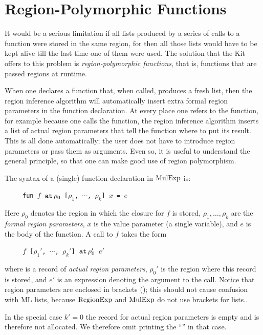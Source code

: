 \documentclass[12pt]{book}
\begin{document}
\section{Region-Polymorphic Functions}
%
It would be a serious limitation if all lists produced by a series of
calls to a function were stored in the same region, for then all those
lists would have to be kept alive till the last time one of them were
used. The solution that the Kit offers to this problem is {\em
  region-polymorphic functions}, that is, functions that are passed
regions at runtime.

When one declares a function that, when called, produces a fresh list,
then the region inference algorithm will automatically insert extra
%
formal region parameters in the function declaration.  At every place
one refers to the function, for example because one calls the
function, the region inference algorithm inserts a list of
%
actual region parameters that tell the function where to put its
result. This is all done automatically; the user does not have to
introduce region parameters or pass them as arguments. Even so, it is
useful to understand the general principle, so that one can make good
use of region polymorphism.

The syntax of a (single) function declaration in $\hbox{\rm MulExp}$ is:
\begin{tabbing}
\ \ \ \ \ \=\tt fun $f$ $\mathbin{\hbox{\tt at}}\,\rho_0$ [$\rho_1$, $\cdots$, $\rho_k$] $x$ = $e$
\end{tabbing}
Here $\rho_0$ denotes the region in which the closure for $f$ is
stored, $\rho_1, \ldots,\rho_k$ are the
%
{\em formal region parameters}, $x$ is the
value parameter (a single variable), and $e$ is the body of the function.
A call to $f$ takes the form
\begin{tabbing}
\ \ \ \ \ \=\tt $f$  [$\rho_1'$, $\cdots$, $\rho_k'$] $\mathbin{\hbox{\tt at}}\,\rho_0'$ $e'$
\end{tabbing}
where  is a record of 
%
{\em actual region parameters},
$\rho_0'$ is the region where this record is stored, and $e'$ is an expression
denoting the argument to the call. Notice that region parameters are enclosed in  brackets
(\boxml{[ ]}); this should not cause confusion with ML lists, because $\hbox{\rm RegionExp}$ and $\hbox{\rm MulExp}$
do not use brackets for lists..

In the special case $k'=0$ the record for actual region parameters is empty
and is therefore not allocated. We therefore omit printing the ``''
in that case.
\end{document}

